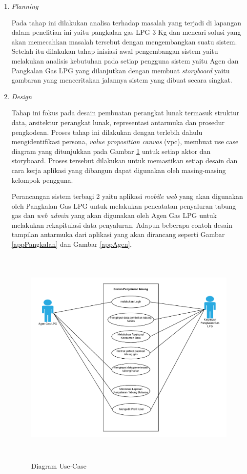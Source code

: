 \begin{enumerate}[1.]
	\item \emph {Planning}
	
	Pada tahap ini dilakukan analisa terhadap masalah yang terjadi di lapangan dalam penelitian ini yaitu pangkalan gas LPG 3 Kg dan mencari solusi yang akan memecahkan masalah tersebut dengan mengembangkan suatu sistem. Setelah itu dilakukan tahap inisiasi awal pengembangan sistem yaitu melakukan analisis kebutuhan pada setiap pengguna sistem yaitu Agen dan Pangkalan Gas LPG yang dilanjutkan dengan membuat \textit{storyboard} yaitu gambaran yang menceritakan jalannya sistem yang dibuat secara singkat.
	
	

	\item \textit{Design}
	
	\par Tahap ini fokus pada desain pembuatan perangkat lunak termasuk struktur data, arsitektur perangkat lunak, representasi antarmuka dan prosedur pengkodean. Proses tahap ini dilakukan dengan terlebih dahulu mengidentifikasi persona, \textit{value proposition canvas} (vpc), membuat use case diagram yang ditunjukkan pada Gambar \ref{usecase} untuk setiap aktor dan storyboard. Proses tersebut dilakukan untuk memastikan setiap desain dan cara kerja aplikasi yang dibangun dapat digunakan oleh masing-masing kelompok pengguna.
	\newpage
	\par Perancangan sistem terbagi 2 yaitu aplikasi \textit{mobile web} yang akan digunakan oleh Pangkalan Gas LPG untuk melakukan pencatatan penyaluran tabung gas dan \textit{web admin} yang akan digunakan oleh Agen Gas LPG untuk melakukan rekapitulasi data penyaluran. Adapun beberapa contoh desain tampilan antarmuka dari aplikasi yang akan dirancang seperti Gambar \ref{appPangkalan} dan Gambar \ref{appAgen}.
	
	\vspace{-0.4cm}
	\begin{figure}[H]
		\center
		\includegraphics [width = 12cm, height= 11cm]{gambar/use-case}
		\caption{Diagram Use-Case}
		\label{usecase}
	\end{figure}
	

\end{enumerate}
